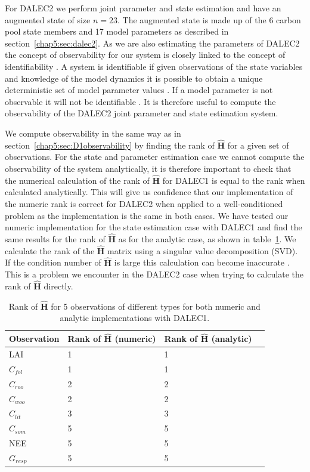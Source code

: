 For DALEC2 we perform joint parameter and state estimation and have an augmented state of size $n = 23$. The augmented state is made up of the 6 carbon pool state members and 17 model parameters as described in section~\ref{chap5:sec:dalec2}. As we are also estimating the parameters of DALEC2 the concept of observability for our system is closely linked to the concept of identifiability \citep{navon1998practical}. A system is identifiable if given observations of the state variables and knowledge of the model dynamics it is possible to obtain a unique deterministic set of model parameter values \citep{ljung1998system}. If a model parameter is not observable it will not be identifiable \citep{Jacquez1985}. It is therefore useful to compute the observability of the DALEC2 joint parameter and state estimation system.

We compute observability in the same way as in section~\ref{chap5:sec:D1observability} by finding the rank of $\hat{\textbf{H}}$ for a given set of observations. For the state and parameter estimation case we cannot compute the observability of the system analytically, it is therefore important to check that the numerical calculation of the rank of $\hat{\textbf{H}}$ for DALEC1 is equal to the rank when calculated analytically. This will give us confidence that our implementation of the numeric rank is correct for DALEC2 when applied to a well-conditioned problem as the implementation is the same in both cases. We have tested our numeric implementation for the state estimation case with DALEC1 and find the same results for the rank of $\hat{\textbf{H}}$ as for the analytic case, as shown in table~\ref{chap5:table: a_n_h_D1}. We calculate the rank of the $\hat{\textbf{H}}$ matrix using a singular value decomposition (SVD). If the condition number of $\hat{\textbf{H}}$ is large this calculation can become inaccurate \citep{Paige1981}. This is a problem we encounter in the DALEC2 case when trying to calculate the rank of $\hat{\textbf{H}}$ directly.  

\begin{table}[ht] 
\begin{center}
	\begin{tabular}{| l | l | l | l}
	\hline
	Observation & Rank of $\hat{\textbf{H}}$ (numeric) & Rank of $\hat{\textbf{H}}$ (analytic) \\ \hline
	LAI & 1 & 1 \\ \hline
	$C_{fol}$ & 1 & 1  \\ \hline
	$C_{roo}$ & 2 & 2 \\ \hline
	$C_{woo}$ & 2 & 2 \\ \hline
	$C_{lit}$ & 3 & 3 \\ \hline
	$C_{som}$ & 5 & 5 \\ \hline
	NEE & 5 & 5 \\ \hline
	$G_{resp}$ & 5 & 5 \\  
	\hline
	\end{tabular}
	\caption{Rank of $\hat{\textbf{H}}$ for 5 observations of different types for both numeric and analytic implementations with DALEC1.}
	\label{chap5:table: a_n_h_D1}
\end{center} 
\end{table}


